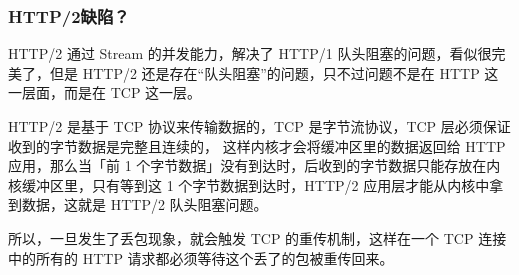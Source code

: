 \documentclass[11pt]{article}
\begin{document}
\subsubsection{HTTP/2缺陷？}
\label{sec:org8d9fe9a}
HTTP/2 通过 Stream 的并发能力，解决了 HTTP/1 队头阻塞的问题，看似很完美了，但是 HTTP/2 还是存在“队头阻塞”的问题，只不过问题不是在 HTTP 这一层面，而是在 TCP 这一层。

HTTP/2 是基于 TCP 协议来传输数据的，TCP 是字节流协议，TCP 层必须保证收到的字节数据是完整且连续的，\- 这样内核才会将缓冲区里的数据返回给 HTTP 应用，那么当「前 1 个字节数据」没有到达时，后收到的字节数据只能存放在内核缓冲区里，只有等到这 1 个字节数据到达时，HTTP/2 应用层才能从内核中拿到数据，这就是 HTTP/2 队头阻塞问题。

所以，一旦发生了丢包现象，就会触发 TCP 的重传机制，这样在一个 TCP 连接中的所有的 HTTP 请求都必须等待这个丢了的包被重传回来。
\end{document}
